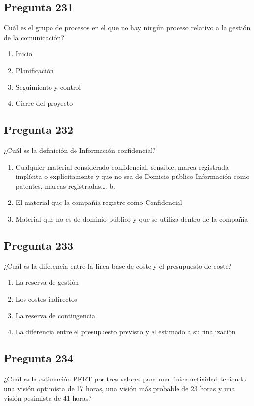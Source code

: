 \documentclass[11pt,a4paper]{article}
\begin{document}
\subsection*{Pregunta 231}
Cuál es el grupo de procesos en el que no hay ningún proceso relativo a la gestión de la comunicación?

\begin{enumerate}[label=\alph*)]
  \item Inicio
  \item Planificación
  \item Seguimiento y control
  \item Cierre del proyecto
\end{enumerate}

\subsection*{Pregunta 232}
¿Cuál es la definición de Información confidencial?

\begin{enumerate}[label=\alph*)]
  \item Cualquier material considerado confidencial, sensible, marca registrada implícita o explícitamente y que no sea de Domicio público Información como patentes, marcas registradas,… b.
  \item El material que la compañía registre como Confidencial
  \item Material que no es de dominio público y que se utiliza dentro de la compañía
\end{enumerate}

\subsection*{Pregunta 233}
¿Cuál es la diferencia entre la línea base de coste y el presupuesto de coste?

\begin{enumerate}[label=\alph*)]
  \item La reserva de gestión
  \item Los costes indirectos
  \item La reserva de contingencia
  \item La diferencia entre el presupuesto previsto y el estimado a su finalización
\end{enumerate}

\subsection*{Pregunta 234}
¿Cuál es la estimación PERT por tres valores para una única actividad teniendo una visión optimista de 17 horas, una visión más probable de 23 horas y una visión pesimista de 41 horas?
\end{document}
